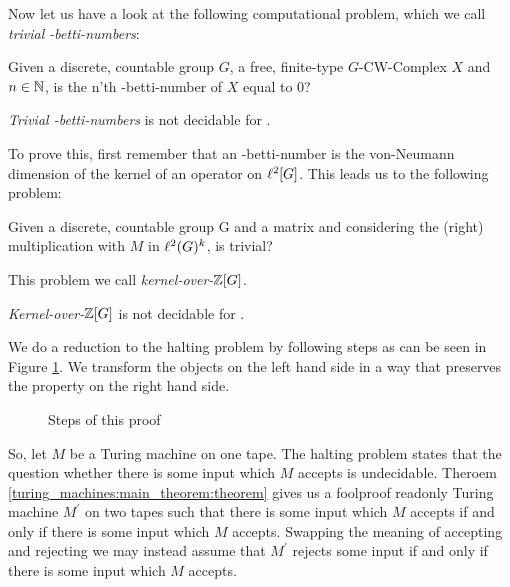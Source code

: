 Now let us have a look at the following computational problem, which we call \emph{trivial \ltwo-betti-numbers}:

\begin{Problem}
	Given a discrete, countable group $G$, a free, finite-type $G$-CW-Complex $X$ and $n \in \mathbb{N}$, is the n'th \ltwo-betti-number of $X$ equal to 0?
\end{Problem}

\begin{Theorem}
	\label{zero-divisor-problem:trivial_betti_numbers}
	\emph{Trivial \ltwo-betti-numbers} is not decidable for .
\end{Theorem}

To prove this, first remember that an \ltwo-betti-number is the von-Neumann dimension of the kernel of an operator on $\ell^2[G]$.
This leads us to the following problem:

\begin{Problem}
	Given a discrete, countable group G and a matrix 
	and considering the (right) multiplication with $M$ in $\ell^2(G)^k$, is  trivial?
\end{Problem}

This problem we call \emph{kernel-over-$\mathbb{Z}[G]$}.

\begin{Theorem}
	\label{zero-divisor-problem:kernel-over-zg}
	\emph{Kernel-over-$\mathbb{Z}[G]$} is not decidable for .
\end{Theorem}

\proof
	We do a reduction to the halting problem by following steps as can be seen in Figure \ref{zero_divisor_problem:main_theorem:fig_proof_plan}.
	We transform the objects on the left hand side in a way that preserves the property on the right hand side.

	\begin{figure}[h]
		\centering
		
		\caption{Steps of this proof}
		\label{zero_divisor_problem:main_theorem:fig_proof_plan}
	\end{figure}

	So, let $M$ be a Turing machine on one tape.
	The halting problem states that the question whether there is some input which $M$ accepts is undecidable.
	Theroem \ref{turing_machines:main_theorem:theorem} gives us a foolproof readonly Turing machine $M^\prime$ on two tapes such that there is some input which $M$ accepts if and only if there is some input which $M$ accepts.\footnotemark
	Swapping the meaning of accepting and rejecting we may instead assume that $M^\prime$ rejects some input if and only if there is some input which $M$ accepts.

